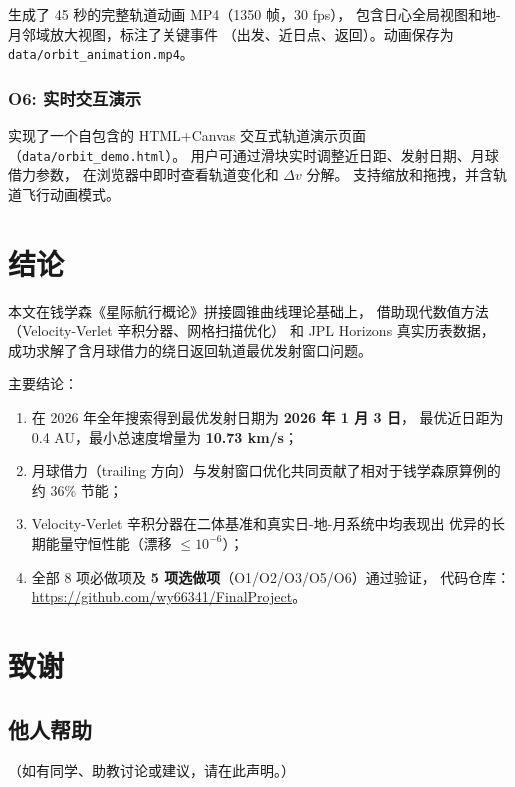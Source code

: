 \documentclass[12pt,a4paper]{ctexart}
\begin{document}
生成了 45 秒的完整轨道动画 MP4（1350 帧，30 fps），
包含日心全局视图和地-月邻域放大视图，标注了关键事件
（出发、近日点、返回）。动画保存为 \texttt{data/orbit\_animation.mp4}。

\subsubsection*{O6: 实时交互演示}

实现了一个自包含的 HTML+Canvas 交互式轨道演示页面
（\texttt{data/orbit\_demo.html}）。
用户可通过滑块实时调整近日距、发射日期、月球借力参数，
在浏览器中即时查看轨道变化和 $\Delta v$ 分解。
支持缩放和拖拽，并含轨道飞行动画模式。

\section{结论}

本文在钱学森《星际航行概论》拼接圆锥曲线理论基础上，
借助现代数值方法（Velocity-Verlet 辛积分器、网格扫描优化）
和 JPL Horizons 真实历表数据，
成功求解了含月球借力的绕日返回轨道最优发射窗口问题。

主要结论：
\begin{enumerate}
\item 在 2026 年全年搜索得到最优发射日期为 \textbf{2026 年 1 月 3 日}，
  最优近日距为 0.4 AU，最小总速度增量为 \textbf{10.73 km/s}；
\item 月球借力（trailing 方向）与发射窗口优化共同贡献了相对于钱学森原算例的
  约 36\% 节能；
\item Velocity-Verlet 辛积分器在二体基准和真实日-地-月系统中均表现出
  优异的长期能量守恒性能（漂移 $\leq 10^{-6}$）；
\item 全部 8 项必做项及 \textbf{5 项选做项}（O1/O2/O3/O5/O6）通过验证，
  代码仓库：\url{https://github.com/wy66341/FinalProject}。
\end{enumerate}

\section{致谢}

\subsection{他人帮助}
（如有同学、助教讨论或建议，请在此声明。）
\end{document}
